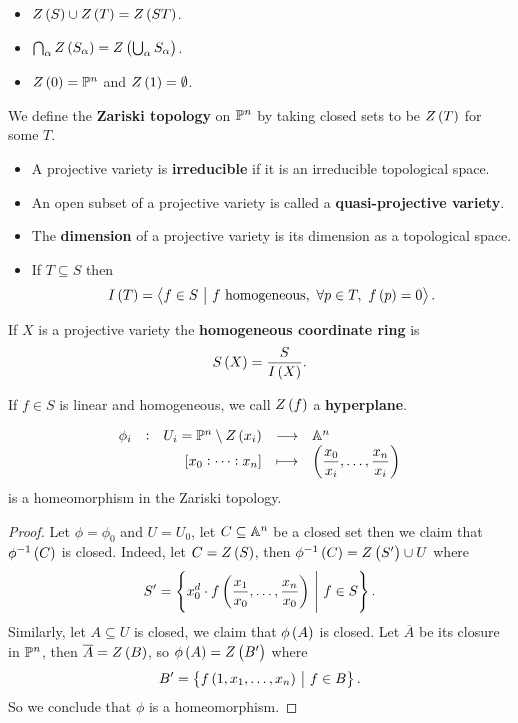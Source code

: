 \begin{proposition}
\hfill
\begin{itemize}
\item $ Z\br{S} \cup Z\br{T} = Z\br{ST} $.
\item $ \bigcap_\alpha Z\br{S_\alpha} = Z\br{\bigcup_\alpha S_\alpha} $.
\item $ Z\br{0} = \PP^n $ and $ Z\br{1} = \emptyset $.
\end{itemize}
\end{proposition}

\begin{definition}
We define the \textbf{Zariski topology} on $ \PP^n $ by taking closed sets to be $ Z\br{T} $ for some $ T $.
\end{definition}

\begin{definition}
\hfill
\begin{itemize}
\item A projective variety is \textbf{irreducible} if it is an irreducible topological space.
\item An open subset of a projective variety is called a \textbf{quasi-projective variety}.
\item The \textbf{dimension} of a projective variety is its dimension as a topological space.
\item If $ T \subseteq S $ then
$$ I\br{T} = \abr{f \in S \st f \ \text{homogeneous}, \ \forall p \in T, \ f\br{p} = 0}. $$
\end{itemize}
\end{definition}

\begin{definition}
If $ X $ is a projective variety the \textbf{homogeneous coordinate ring} is
$$ S\br{X} = \dfrac{S}{I\br{X}}. $$
\end{definition}

\begin{definition}
If $ f \in S $ is linear and homogeneous, we call $ Z\br{f} $ a \textbf{hyperplane}.
\end{definition}


\begin{proposition}
$$ \function[\phi_i]{U_i = \PP^n \setminus Z\br{x_i}}{\AA^n}{\sbr{x_0 : \dots : x_n}}{\br{\dfrac{x_0}{x_i}, \dots, \dfrac{x_n}{x_i}}} $$
is a homeomorphism in the Zariski topology.
\end{proposition}

\begin{proof}
Let $ \phi = \phi_0 $ and $ U = U_0 $, let $ C \subseteq \AA^n $ be a closed set then we claim that $ \phi^{-1}\br{C} $ is closed. Indeed, let $ C = Z\br{S} $, then $ \phi^{-1}\br{C} = Z\br{S'} \cup U $ where
$$ S' = \cbr{x_0^d \cdot f\br{\dfrac{x_1}{x_0}, \dots, \dfrac{x_n}{x_0}} \st f \in S}. $$
Similarly, let $ A \subseteq U $ is closed, we claim that $ \phi\br{A} $ is closed. Let $ \overline{A} $ be its closure in $ \PP^n $, then $ \overline{A} = Z\br{B} $, so $ \phi\br{A} = Z\br{B'} $ where
$$ B' = \cbr{f\br{1, x_1, \dots, x_n} \st f \in B}. $$
So we conclude that $ \phi $ is a homeomorphism.
\end{proof}

